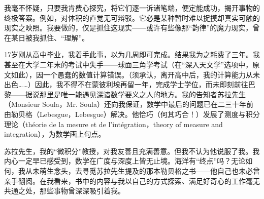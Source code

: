 我毫不怀疑，只要我肯费心探究，将它们逐一诉诸笔端，便定能成功，揭开事物的终极答案。例如，对体积的直觉无可辩驳。它必是某种暂时难以捉摸却真实可触的现实之映照。我要做的，仅是抓住这现实——或许有些像那“韵律”的魔力现实，曾在某日被我抓住、“理解”。

17岁刚从高中毕业，我着手此事，以为几周即可完成。结果我为之耗费了三年。我甚至在大学二年末的考试中失手——球面三角学考试（在“深入天文学”选项中，原文如此），因一个愚蠢的数值计算错误。（须承认，离开高中后，我的计算能力从未出色……）因此，我不得不在蒙彼利埃再留一年，完成学士学位，而未即刻前往巴黎——据说那里是唯一能遇见深谙数学要义之人的地方。我的告知者苏拉先生（Monsieur Soula，Mr. Soula）还向我保证，数学中最后的问题已在二三十年前由勒贝格（Lebesgue，Lebesgue）解决。他恰巧（何其巧合！）发展了测度与积分理论（théorie de la mesure et de l'intégration，theory of measure and integration），为数学画上句点。

苏拉先生，我的“微积分”教授，对我友善且充满善意。但我不认为他说服了我。我内心一定早已感受到，数学在广度与深度上皆无止境。海洋有“终点”吗？无论如何，我从未萌生念头，去寻觅苏拉先生提及的那本勒贝格之书——他自己也未必曾亲手翻阅。在我看来，书中的内容与我以自己的方式探索、满足好奇心的工作毫无共通之处，那些事物曾深深吸引着我。